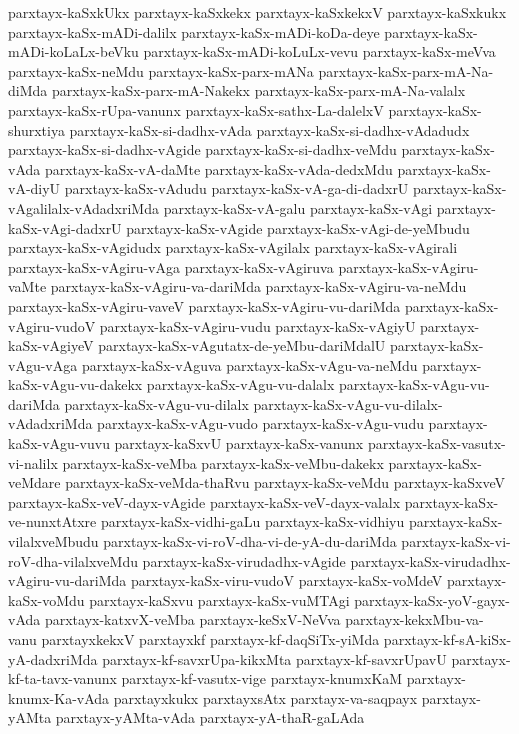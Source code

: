 {parxtayx-kaSxkUkx
parxtayx-kaSxkekx
parxtayx-kaSxkekxV
parxtayx-kaSxkukx
parxtayx-kaSx-mADi-dalilx
parxtayx-kaSx-mADi-koDa-deye
parxtayx-kaSx-mADi-koLaLx-beVku
parxtayx-kaSx-mADi-koLuLx-vevu
parxtayx-kaSx-meVva
parxtayx-kaSx-neMdu
parxtayx-kaSx-parx-mANa
parxtayx-kaSx-parx-mA-Na-diMda
parxtayx-kaSx-parx-mA-Nakekx
parxtayx-kaSx-parx-mA-Na-valalx
parxtayx-kaSx-rUpa-vanunx
parxtayx-kaSx-sathx-La-dalelxV
parxtayx-kaSx-shurxtiya
parxtayx-kaSx-si-dadhx-vAda
parxtayx-kaSx-si-dadhx-vAdadudx
parxtayx-kaSx-si-dadhx-vAgide
parxtayx-kaSx-si-dadhx-veMdu
parxtayx-kaSx-vAda
parxtayx-kaSx-vA-daMte
parxtayx-kaSx-vAda-dedxMdu
parxtayx-kaSx-vA-diyU
parxtayx-kaSx-vAdudu
parxtayx-kaSx-vA-ga-di-dadxrU
parxtayx-kaSx-vAgalilalx-vAdadxriMda
parxtayx-kaSx-vA-galu
parxtayx-kaSx-vAgi
parxtayx-kaSx-vAgi-dadxrU
parxtayx-kaSx-vAgide
parxtayx-kaSx-vAgi-de-yeMbudu
parxtayx-kaSx-vAgidudx
parxtayx-kaSx-vAgilalx
parxtayx-kaSx-vAgirali
parxtayx-kaSx-vAgiru-vAga
parxtayx-kaSx-vAgiruva
parxtayx-kaSx-vAgiru-vaMte
parxtayx-kaSx-vAgiru-va-dariMda
parxtayx-kaSx-vAgiru-va-neMdu
parxtayx-kaSx-vAgiru-vaveV
parxtayx-kaSx-vAgiru-vu-dariMda
parxtayx-kaSx-vAgiru-vudoV
parxtayx-kaSx-vAgiru-vudu
parxtayx-kaSx-vAgiyU
parxtayx-kaSx-vAgiyeV
parxtayx-kaSx-vAgutatx-de-yeMbu-dariMdalU
parxtayx-kaSx-vAgu-vAga
parxtayx-kaSx-vAguva
parxtayx-kaSx-vAgu-va-neMdu
parxtayx-kaSx-vAgu-vu-dakekx
parxtayx-kaSx-vAgu-vu-dalalx
parxtayx-kaSx-vAgu-vu-dariMda
parxtayx-kaSx-vAgu-vu-dilalx
parxtayx-kaSx-vAgu-vu-dilalx-vAdadxriMda
parxtayx-kaSx-vAgu-vudo
parxtayx-kaSx-vAgu-vudu
parxtayx-kaSx-vAgu-vuvu
parxtayx-kaSxvU
parxtayx-kaSx-vanunx
parxtayx-kaSx-vasutx-vi-nalilx
parxtayx-kaSx-veMba
parxtayx-kaSx-veMbu-dakekx
parxtayx-kaSx-veMdare
parxtayx-kaSx-veMda-thaRvu
parxtayx-kaSx-veMdu
parxtayx-kaSxveV
parxtayx-kaSx-veV-dayx-vAgide
parxtayx-kaSx-veV-dayx-valalx
parxtayx-kaSx-ve-nunxtAtxre
parxtayx-kaSx-vidhi-gaLu
parxtayx-kaSx-vidhiyu
parxtayx-kaSx-vilalxveMbudu
parxtayx-kaSx-vi-roV-dha-vi-de-yA-du-dariMda
parxtayx-kaSx-vi-roV-dha-vilalxveMdu
parxtayx-kaSx-virudadhx-vAgide
parxtayx-kaSx-virudadhx-vAgiru-vu-dariMda
parxtayx-kaSx-viru-vudoV
parxtayx-kaSx-voMdeV
parxtayx-kaSx-voMdu
parxtayx-kaSxvu
parxtayx-kaSx-vuMTAgi
parxtayx-kaSx-yoV-gayx-vAda
parxtayx-katxvX-veMba
parxtayx-keSxV-NeVva
parxtayx-kekxMbu-va-vanu
parxtayxkekxV
parxtayxkf
parxtayx-kf-daqSiTx-yiMda
parxtayx-kf-sA-kiSx-yA-dadxriMda
parxtayx-kf-savxrUpa-kikxMta
parxtayx-kf-savxrUpavU
parxtayx-kf-ta-tavx-vanunx
parxtayx-kf-vasutx-vige
parxtayx-knumxKaM
parxtayx-knumx-Ka-vAda
parxtayxkukx
parxtayxsAtx
parxtayx-va-saqpayx
parxtayx-yAMta
parxtayx-yAMta-vAda
parxtayx-yA-thaR-gaLAda
}
